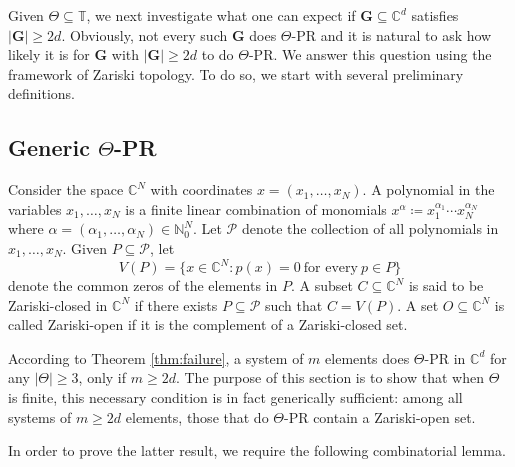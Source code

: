 \documentclass[reqno,a4paper,11pt]{amsart}
\numberwithin{equation}{section}
\def\N{{\mathbb N}}
\def\T{{\mathbb T}}
\def\C{{\mathbb C}}
\newcommand{\Cd}{{\C^d}}
\newcommand\1{\mathds{1}}
\begin{document}
Given $\Theta\subseteq \T$, we next investigate what one can expect if $\mathbf{G}\subseteq \C^d$ satisfies $|\mathbf{G}|\geq 2d$. Obviously, not every such $\mathbf{G}$ does $\Theta$-PR and it is natural to ask how likely it is for $\mathbf{G}$ with $|\mathbf{G}|\geq 2d$ to do $\Theta$-PR. We answer this question using the framework of Zariski topology. To do so, we start with several preliminary definitions.

\subsection{Generic $\Theta$-PR}\label{sec:zariski_topology}
Consider the space $\C^N$ with coordinates $x = (x_1,\dots,x_N)$. A polynomial in the variables $x_1,\dots,x_N$ is a finite linear combination of monomials $x^\alpha \coloneqq x_1^{\alpha_1} \cdots x_N^{\alpha_N}$ where $\alpha = (\alpha_1,\dots,\alpha_N) \in \N_{0}^N$. Let $\mathcal{P}$ denote the collection of all polynomials in $x_1,\dots,x_N$. Given $P \subseteq \mathcal{P}$, let
$$
V(P) = \{ x \in \C^N : p(x) = 0 \ \text{for every} \ p \in P \}
$$
denote the common zeros of the elements in $P$. A subset $C \subseteq \C^N$ is said to be Zariski-closed in $\C^N$ if there exists $P \subseteq \mathcal{P}$ such that $C=V(P)$. A set $O \subseteq \C^N$ is called Zariski-open if it is the complement of a Zariski-closed set.

According to Theorem \ref{thm:failure}, a system of $m$ elements does $\Theta$-PR in $\Cd$ for any $|\Theta| \geq 3$, only if $m \geq 2d$. The purpose of this section is to show that when $\Theta$ is finite, this necessary condition is in fact generically sufficient: among all systems of $m \geq 2d$ elements, those that do $\Theta$-PR contain a Zariski-open set. 

In order to prove the latter result, we require the following combinatorial lemma.
\end{document}
